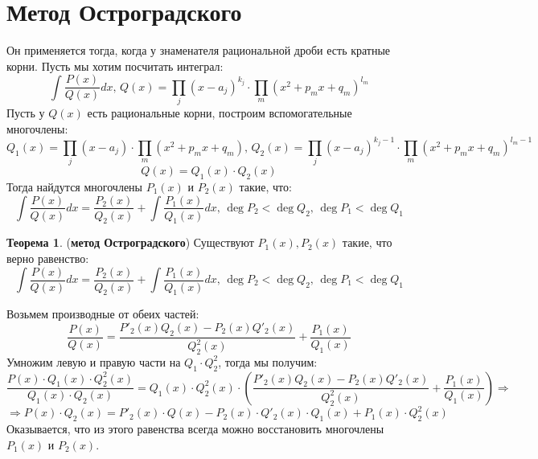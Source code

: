 \documentclass[12pt]{article}
\theoremstyle{definition}
\newtheorem{theorem}{Теорема}
\DeclareMathOperator{\dint}{\displaystyle\int}
\begin{document}
\section*{Метод Остроградского}
Он применяется тогда, когда у знаменателя рациональной дроби есть кратные корни. Пусть мы хотим посчитать интеграл:
$$
	\dint \dfrac{P(x)}{Q(x)}dx, \, Q(x) = \prod\limits_{j}(x - a_j)^{k_j}{\cdot}\prod\limits_{m}(x^2 + p_m x + q_m)^{l_m}
$$
Пусть у $Q(x)$ есть рациональные корни, построим вспомогательные многочлены:
$$
	Q_1(x) = \prod\limits_{j}(x - a_j){\cdot}\prod\limits_{m}(x^2 + p_m x + q_m), \, Q_2(x) = \prod\limits_{j}(x - a_j)^{k_j-1}{\cdot}\prod\limits_{m}(x^2 + p_m x + q_m)^{l_m-1}
$$
$$
	Q(x) = Q_1(x){\cdot}Q_2(x)
$$
Тогда найдутся многочлены $P_1(x)$ и $P_2(x)$ такие, что:
$$
	\dint \dfrac{P(x)}{Q(x)}dx = \dfrac{P_2(x)}{Q_2(x)} + \dint \dfrac{P_1(x)}{Q_1(x)}dx, \, \deg{P_2} < \deg{Q_2}, \, \deg{P_1} < \deg{Q_1}
$$
\begin{theorem}(\textbf{метод Остроградского})
	Существуют $P_1(x), P_2(x)$ такие, что верно равенство:
	$$
		\dint \dfrac{P(x)}{Q(x)}dx = \dfrac{P_2(x)}{Q_2(x)} + \dint \dfrac{P_1(x)}{Q_1(x)}dx, \, \deg{P_2} < \deg{Q_2}, \, \deg{P_1} < \deg{Q_1}
	$$
\end{theorem}

Возьмем производные от обеих частей:
$$
	\dfrac{P(x)}{Q(x)} = \dfrac{P'_2(x)Q_2(x) - P_2(x)Q'_2(x)}{Q_2^2(x)} + \dfrac{P_1(x)}{Q_1(x)} 
$$
Умножим левую и правую части на $Q_1{\cdot}Q_2^2$, тогда мы получим:
$$
	\dfrac{P(x){\cdot}Q_1(x){\cdot}Q_2^2(x)}{Q_1(x){\cdot}Q_2(x)} = Q_1(x){\cdot}Q_2^2(x){\cdot}\left( \dfrac{P'_2(x)Q_2(x) - P_2(x)Q'_2(x)}{Q_2^2(x)} + \dfrac{P_1(x)}{Q_1(x)} \right) \Rightarrow
$$
$$
	\Rightarrow P(x){\cdot}Q_2(x) = P'_2(x){\cdot}Q(x) - P_2(x){\cdot}Q'_2(x){\cdot}Q_1(x) + P_1(x){\cdot}Q_2^2(x)
$$
Оказывается, что из этого равенства всегда можно восстановить многочлены $P_1(x)$ и $P_2(x)$.
\end{document}

